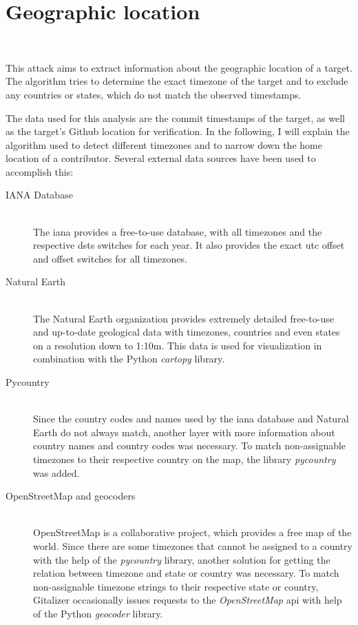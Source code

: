 \section{Geographic location}~\label{timezone-implementation}

This attack aims to extract information about the geographic location of a target.
The algorithm tries to determine the exact timezone of the target and to exclude any countries or states, which do not match the observed timestamps.

The data used for this analysis are the commit timestamps of the target, as well as the target's Github location for verification.
In the following, I will explain the algorithm used to detect different timezones and to narrow down the home location of a contributor.
Several external data sources have been used to accomplish this:

\begin{description}
    \item[IANA Database] \hfill \\
    The \ac{iana} provides a free-to-use database, with all timezones and the respective \acp{dst} switches for each year.
    It also provides the exact \ac{utc} offset and offset switches for all timezones.

    \item[Natural Earth] \hfill \\
    The Natural Earth organization provides extremely detailed free-to-use and up-to-date geological data with timezones, countries and even states on a resolution down to 1:10m.
    This data is used for visualization in combination with the Python \emph{cartopy} library.

    \item[Pycountry] \hfill \\
    Since the country codes and names used by the \ac{iana} database and Natural Earth do not always match, another layer with more information about country names and country codes was necessary.
    To match non-assignable timezones to their respective country on the map, the library \emph{pycountry} was added.

    \item[OpenStreetMap and geocoders] \hfill \\
    OpenStreetMap is a collaborative project, which provides a free map of the world.
    Since there are some timezones that cannot be assigned to a country with the help of the \emph{pycountry} library, another solution for getting the relation between timezone and state or country was necessary.
    To match non-assignable timezone strings to their respective state or country, Gitalizer occasionally issues requests to the \emph{OpenStreetMap} \ac{api} with help of the Python \emph{geocoder} library.

\end{description}

